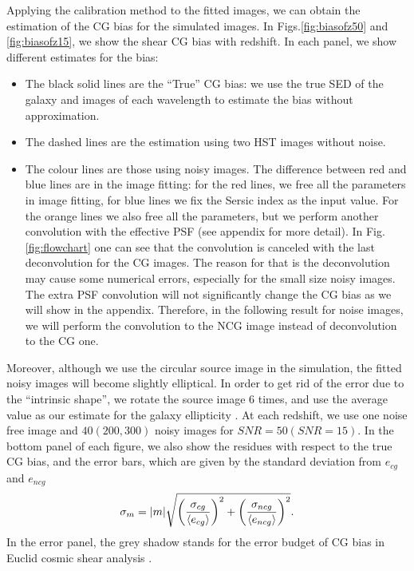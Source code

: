 \documentclass[useAMS,usenatbib]{mn2e}
\newcommand{\be}{\begin{equation}}
\newcommand{\ee}{\end{equation}}
\newcommand{\rund}[1]{\left(#1\right)}
\def\elabel#1{\label{eq:#1}}
\begin{document}
Applying the calibration method to the fitted images, we can obtain
the estimation of the CG bias for the simulated images. In
Figs.\ref{fig:biasofz50} and \ref{fig:biasofz15}, we show the shear CG
bias with redshift. In each panel, we show different estimates for the
bias:
\begin{itemize}
\item
The black solid lines are the ``True'' CG bias: we use the true
SED of the galaxy and images of each wavelength to estimate the bias
without approximation.
\item
The dashed lines are the estimation using two
HST images without noise.
\item
The colour lines are those using noisy images. The difference between
red and blue lines are in the image fitting: for the red lines, we
free all the parameters in image fitting, for blue lines we fix the
Sersic index as the input value. For the orange lines we also free all
the parameters, but we perform another convolution with the effective
PSF (see appendix for more detail). In Fig.\ref{fig:flowchart} one can
see that the convolution is canceled with the last deconvolution for
the CG images.  The reason for that is the deconvolution may cause
some numerical errors, especially for the small size noisy images. The
extra PSF convolution will not significantly change the CG bias as we
will show in the appendix. Therefore, in the following result for
noise images, we will perform the convolution to the NCG image instead
of deconvolution to the CG one.
\end{itemize}
Moreover, although we use the circular source image in the simulation,
the fitted noisy images will become slightly elliptical. In order to
get rid of the error due to the ``intrinsic shape'', we rotate the
source image $6$ times, and use the average value as our estimate for
the galaxy ellipticity \citep{2007AJ....133.1763N}. At each redshift,
we use one noise free image and $40 (200, 300)$ noisy images for $SNR=50
(SNR=15)$.  In the bottom panel of each figure, we also show the
residues with respect to the true CG bias, and the error bars, which
are given by the standard deviation from $e_{cg}$ and $e_{ncg}$
%
\be
\sigma_m= |m| \sqrt{\rund{\sigma_{cg} \over \langle e_{cg}\rangle }^2
  + \rund{\sigma_{ncg} \over \langle e_{ncg} \rangle}^2 }.
\elabel{sigmam}
\ee
%
In the error panel, the grey shadow stands for the error budget of CG
bias in Euclid cosmic shear analysis \citep[$\pm
  0.00025$][]{2013MNRAS.431.3103C,2013MNRAS.429..661M}.
\end{document}
